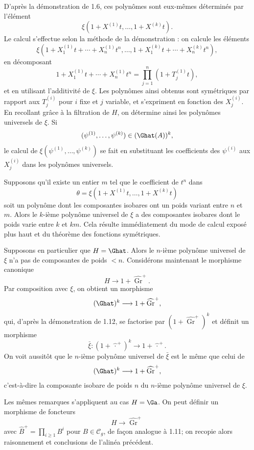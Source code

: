 \documentclass[11pt]{article}
\begin{document}
D'après la démonstration de 1.6, ces polynômes sont eux-mêmes déterminés par l'élément
\[
  \xi(1+X^{(1)}t,\ldots,1+X^{(k)}t).
\]
Le calcul s'effectue selon la méthode de la démonstration : on calcule les éléments
\[
  \xi(1+X_1^{(1)}t+\cdots+X_n^{(1)}t^n,\ldots,
  1+X_1^{(k)}t+\cdots+X_n^{(k)}t^n),
\]
en décomposant
\[
  1+X_1^{(1)}t+\cdots+X_n^{(1)}t^n
  =
  \prod_{j=1}^{n}(1+T_j^{(1)}t),
\]
et en utilisant l'additivité de \(\xi\). Les polynômes ainsi obtenus sont symétriques par rapport aux \(T_j^{(i)}\) pour \(i\) fixe et \(j\) variable, et s'expriment en fonction des \(X_j^{(i)}\). En recollant grâce à la filtration de \(H\), on détermine ainsi les polynômes universels de \(\xi\). Si
\[
  (\psi^{(1)},\ldots,\psi^{(k)})\in(\Ghat(A))^k,
\]
le calcul de \(\xi(\psi^{(1)},\ldots,\psi^{(k)})\) se fait en substituant les coefficients des \(\psi^{(i)}\) aux \(X_j^{(i)}\) dans les polynômes universels.

Supposons qu'il existe un entier \(m\) tel que le coefficient de \(t^n\) dans
\[
  \theta=\xi(1+X^{(1)}t,\ldots,1+X^{(k)}t)
\]
soit un polynôme dont les composantes isobares ont un poids variant entre \(n\) et \(m\). Alors le \(k\)-ième polynôme universel de \(\xi\) a des composantes isobares dont le poids varie entre \(k\) et \(km\). Cela résulte immédiatement du mode de calcul exposé plus haut et du théorème des fonctions symétriques.

Supposons en particulier que \(H=\Ghat\). Alors le \(n\)-ième polynôme universel de \(\xi\) n'a pas de composantes de poids \(<n\). Considérons maintenant le morphisme canonique
\[
  H\longrightarrow1+\widehat{\operatorname{Gr}}^{+}.
\]
Par composition avec \(\xi\), on obtient un morphisme
\[
  (\Ghat)^k\longrightarrow1+\widehat{\operatorname{Gr}}^{+},
\]
qui, d'après la démonstration de 1.12, se factorise par \((1+\widehat{\operatorname{Gr}}^{+})^k\) et définit un morphisme
\[
  \bar\xi:(1+\widehat{\,\cdot\,}^{+})^k\longrightarrow1+\widehat{\,\cdot\,}^{+}.
\]
On voit aussitôt que le \(n\)-ième polynôme universel de \(\bar\xi\) est le même que celui de
\[
  (\Ghat)^k\longrightarrow1+\widehat{\operatorname{Gr}}^{+},
\]
c'est-à-dire la composante isobare de poids \(n\) du \(n\)-ième polynôme universel de \(\xi\).

Les mêmes remarques s'appliquent au cas \(H=\Ga\). On peut définir un morphisme de foncteurs
\[
  H\longrightarrow\widehat{\operatorname{Gr}}^{+}
\]
avec \(\widehat B^+=\prod_{i\geq1}B^i\) pour \(B\in\mathcal C_g\), de façon analogue à 1.11; on recopie alors raisonnement et conclusions de l'alinéa précédent.
\end{document}
